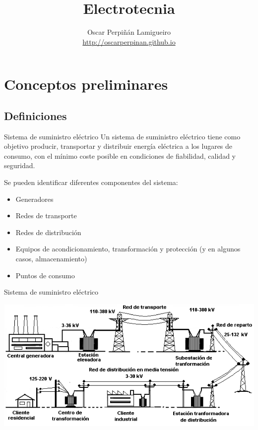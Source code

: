 \documentclass[xcolor={usenames,svgnames,dvipsnames}]{beamer}
\author{Oscar Perpiñán Lamigueiro \\ \url{http://oscarperpinan.github.io}}
\date{}
\title{Electrotecnia}
\begin{document}
\maketitle

\section{Conceptos preliminares}
\label{sec:org0450334}
\subsection{Definiciones}
\label{sec:orgcd65bd6}
\begin{frame}[label={sec:org1750916}]{Sistema de suministro eléctrico}
Un \alert{sistema de suministro eléctrico} tiene como objetivo \alert{producir,
transportar y distribuir energía eléctrica} a los lugares de consumo,
con el mínimo coste posible en condiciones de \alert{fiabilidad, calidad y
seguridad}.

Se pueden identificar diferentes componentes del sistema:

\begin{itemize}
\item Generadores

\item Redes de transporte

\item Redes de distribución

\item Equipos de acondicionamiento, transformación y protección (y en
algunos casos, almacenamiento)

\item Puntos de consumo
\end{itemize}
\end{frame}

\begin{frame}[label={sec:orgdd32162}]{Sistema de suministro eléctrico}
\begin{center}
\includegraphics[width=.9\linewidth]{../figs/Redelectrica2.png}
\end{center}
\end{frame}
\end{document}
